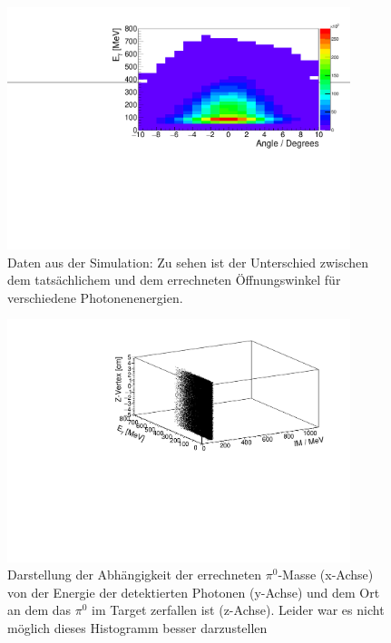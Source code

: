\documentclass[a4paper,11pt,oneside,final,german,openbib,pdftex]{scrbook}
\begin{document}
{\begin{appendix}
\begin{figure}[h!]
	\begin{center}
		\includegraphics[width=100mm]{NewCalib/20171904SimOpeningAngleDeviation}
		\caption[Simulation: Unterschied zwischen dem rek. und den gen. \"Offnungswinkel]{Daten aus der Simulation: Zu sehen ist der Unterschied zwischen dem tats\"achlichem und dem errechneten \"Offnungswinkel f\"ur verschiedene Photonenenergien.}
		\label{fig:Unterschied-Rec-Gen-Opening-Angle}
	\end{center}
\end{figure}


\begin{figure}[h!]
	\begin{center}
		\includegraphics[width=100mm]{NewCalib/20171904SimZVertex3DHist}
		\caption[Simulation: 3D-Hist Z-Vertex]{Darstellung der Abh\"angigkeit der errechneten $\pi^0$-Masse (x-Achse) von der Energie der detektierten Photonen (y-Achse) und dem Ort an dem das $\pi^0$ im Target zerfallen ist (z-Achse).
		Leider war es nicht m\"oglich dieses Histogramm besser darzustellen}
	\label{fig:Z-Vertex-3D-Hist}
	\end{center}
\end{figure}



\end{appendix}}
\end{document}
